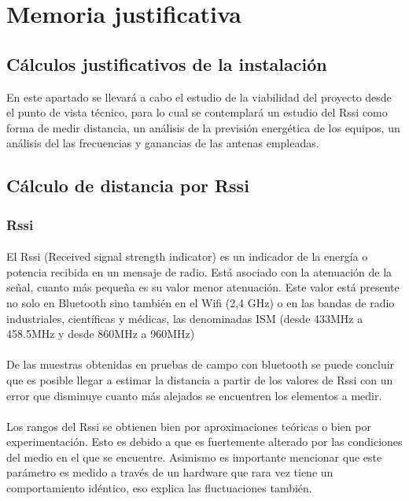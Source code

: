 \documentclass[paper=a4, fontsize=11pt,twoside]{scrartcl}	%
\begin{document}
\section{Memoria justificativa}
    \subsection{Cálculos justificativos de la instalación}
        En este apartado se llevará a cabo el estudio de la viabilidad del proyecto desde el punto de vista
        técnico, para lo cual se contemplará un estudio del Rssi como forma de medir distancia, un análisis 
        de la previsión energética de los equipos, un análisis del las frecuencias y ganancias de las antenas 
        empleadas.
    \subsection{Cálculo de distancia por Rssi}
        \subsubsection{Rssi}
            \paragraph{}
            El Rssi (Received signal strength indicator) es un indicador de la energía o potencia recibida en un mensaje de radio. 
            Está asociado con la atenuación de la señal, cuanto más pequeña es su valor menor atenuación. Este valor está 
            presente no solo en Bluetooth sino también en el Wifi (2,4 GHz) o en las bandas de radio industriales, científicas y médicas,
            las denominadas ISM (desde 433MHz a 458.5MHz y desde 860MHz a 960MHz)
            \paragraph{}
            De las muestras obtenidas en pruebas de campo con bluetooth se puede concluir que es posible llegar a estimar la distancia
            a partir de los valores de Rssi con un error que disminuye cuanto más alejados se encuentren los elementos a medir. 
            \paragraph{}
            Los rangos del Rssi se obtienen bien por aproximaciones teóricas o bien por experimentación. Esto es debido a que 
            es fuertemente alterado por las condiciones del medio en el que se encuentre. Asimismo es importante mencionar que
            este parámetro es medido a través de un hardware que rara vez tiene un comportamiento idéntico, eso explica las fluctuaciones 
            también.
\end{document}
